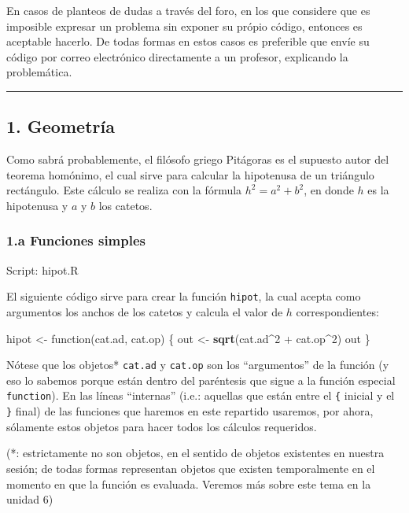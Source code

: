 \documentclass[]{article}
\newenvironment{Shaded}{}{}
\newcommand{\KeywordTok}[1]{\textcolor[rgb]{0.00,0.44,0.13}{\textbf{{#1}}}}
\newcommand{\DecValTok}[1]{\textcolor[rgb]{0.25,0.63,0.44}{{#1}}}
\newcommand{\NormalTok}[1]{{#1}}
\begin{document}
En casos de planteos de dudas a través del foro, en los que considere
que es imposible expresar un problema sin exponer su própio código,
entonces es aceptable hacerlo. De todas formas en estos casos es
preferible que envíe su código por correo electrónico directamente a un
profesor, explicando la problemática.

\begin{center}\rule{3in}{0.4pt}\end{center}

\subsection{1. Geometría}

Como sabrá probablemente, el filósofo griego Pitágoras es el supuesto
autor del teorema homónimo, el cual sirve para calcular la hipotenusa de
un triángulo rectángulo. Este cálculo se realiza con la fórmula
$h^2 = a^2 + b^2$, en donde $h$ es la hipotenusa y $a$ y $b$ los
catetos.

\subsubsection{1.a Funciones simples}

Script: hipot.R

El siguiente código sirve para crear la función \texttt{hipot}, la cual
acepta como argumentos los anchos de los catetos y calcula el valor de
$h$ correspondientes:

\begin{Shaded}
\begin{Highlighting}[]
\NormalTok{hipot <- function(cat.ad, cat.op) \{}
    \NormalTok{out <- }\KeywordTok{sqrt}\NormalTok{(cat.ad^}\DecValTok{2} \NormalTok{+ cat.op^}\DecValTok{2}\NormalTok{)}
    \NormalTok{out}
\NormalTok{\}}
\end{Highlighting}
\end{Shaded}
Nótese que los objetos* \texttt{cat.ad} y \texttt{cat.op} son los
``argumentos'' de la función (y eso lo sabemos porque están dentro del
paréntesis que sigue a la función especial \texttt{function}). En las
líneas ``internas'' (i.e.: aquellas que están entre el \texttt{\{}
inicial y el \texttt{\}} final) de las funciones que haremos en este
repartido usaremos, por ahora, sólamente estos objetos para hacer todos
los cálculos requeridos.

(*: estrictamente no son objetos, en el sentido de objetos existentes en
nuestra sesión; de todas formas representan objetos que existen
temporalmente en el momento en que la función es evaluada. Veremos más
sobre este tema en la unidad 6)
\end{document}
